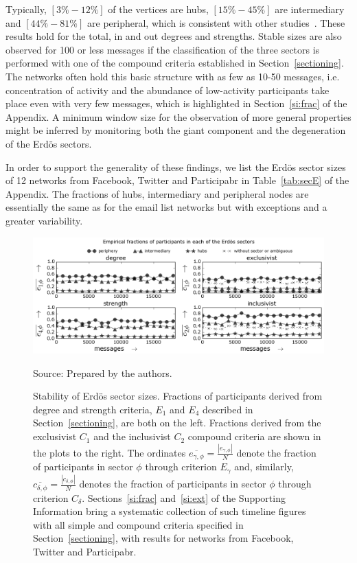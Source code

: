 Typically, $[3\%-12\%]$ of the vertices are hubs,
$[15\%-45\%]$ are intermediary and $[44\%-81\%]$ are peripheral,
which is consistent with other studies~\cite{secFree}.
These results hold for the total, in and out degrees and strengths.
Stable sizes are also observed for 100 or less messages if the classification 
of the three sectors is performed with one of the compound criteria established in Section~\ref{sectioning}. The networks often hold this basic structure with as few as 10-50 messages, i.e. concentration of activity and the abundance of low-activity participants take place even with very few messages, which is highlighted in Section~\ref{si:frac} of the Appendix.
A minimum window size for the observation of more general properties might be inferred by monitoring 
both the giant component and the degeneration of the Erd\"os sectors.

In order to support the generality of these findings,
we list the Erd\"os sector sizes of 12 networks from Facebook, Twitter and Participabr in Table~\ref{tab:secE} of the Appendix.
The fractions of hubs, intermediary and peripheral nodes are
essentially the same as for the email list networks but with exceptions and a greater variability.

\begin{figure} 
\centering
\caption{Stability of Erd\"os sector sizes.
Fractions of participants derived from degree and strength criteria, $E_1$ and $E_4$ described in Section~\ref{sectioning}, are both on the left.
Fractions derived from the exclusivist $C_1$ and the inclusivist $C_2$ compound criteria are shown in the plots to the right.
The ordinates $\overline{e_{\gamma,\phi}}=\frac{|e_{\gamma,\phi}|}{N}$ denote the fraction of participants in sector $\phi$ through criterion $E_\gamma$
and, similarly, $\overline{c_{\delta,\phi}}=\frac{|c_{\delta,\phi}|}{N}$ denotes the fraction of participants in sector $\phi$ through criterion $C_\delta$.
Sections~\ref*{si:frac} and~\ref*{si:ext} of the Supporting Information bring a systematic collection of such timeline figures with all simple and compound criteria specified in Section~\ref{sectioning}, with results for networks from Facebook, Twitter and Participabr.}
\includegraphics[width=\textwidth]{figs/InText-WLAU-S1000__}
\begin{flushleft}
		Source: Prepared by the authors.\
\end{flushleft}
\label{fig:sectIL}
\end{figure}


